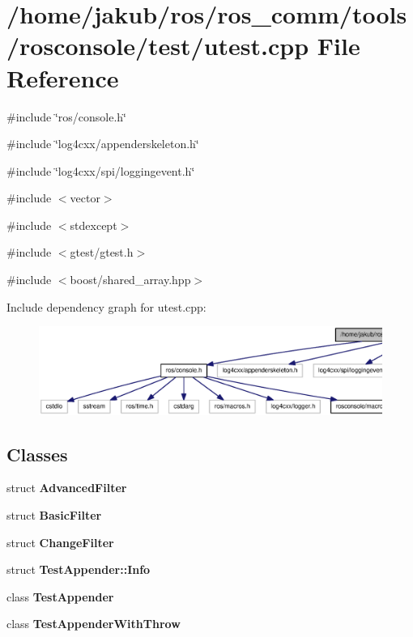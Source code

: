 \section{/home/jakub/ros/ros\_\-comm/tools/rosconsole/test/utest.cpp File Reference}
\label{utest_8cpp}
{\ttfamily \#include \char`\"{}ros/console.h\char`\"{}}\par
{\ttfamily \#include \char`\"{}log4cxx/appenderskeleton.h\char`\"{}}\par
{\ttfamily \#include \char`\"{}log4cxx/spi/loggingevent.h\char`\"{}}\par
{\ttfamily \#include $<$vector$>$}\par
{\ttfamily \#include $<$stdexcept$>$}\par
{\ttfamily \#include $<$gtest/gtest.h$>$}\par
{\ttfamily \#include $<$boost/shared\_\-array.hpp$>$}\par
Include dependency graph for utest.cpp:
\nopagebreak
\begin{figure}[H]
\begin{center}
\leavevmode
\includegraphics[width=400pt]{utest_8cpp__incl}
\end{center}
\end{figure}
\subsection*{Classes}
\begin{DoxyCompactItemize}
\item 
struct {\bf AdvancedFilter}
\item 
struct {\bf BasicFilter}
\item 
struct {\bf ChangeFilter}
\item 
struct {\bf TestAppender::Info}
\item 
class {\bf TestAppender}
\item 
class {\bf TestAppenderWithThrow}
\end{DoxyCompactItemize}

